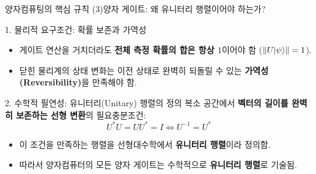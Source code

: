 \documentclass[aspectratio=169, 10pt]{beamer}
\begin{document}
\begin{frame}{양자컴퓨팅의 핵심 규칙 (3)}{양자 게이트: 왜 유니터리 행렬이어야 하는가?} \pause
    \begin{block}{1. 물리적 요구조건: 확률 보존과 가역성}
        \begin{itemize}
            \item 게이트 연산을 거치더라도 \textbf{전체 측정 확률의 합은 항상 $1$}이어야 함 ($\|U|\psi\rangle\| = 1$).
            \item 닫힌 물리계의 상태 변화는 이전 상태로 완벽히 되돌릴 수 있는 \textbf{가역성(Reversibility)}을 만족해야 함.
        \end{itemize}
    \end{block}
    \vspace{0.08cm} \pause
    \begin{exampleblock}{2. 수학적 필연성: 유니터리(Unitary) 행렬의 정의}
        복소 공간에서 \textbf{벡터의 길이를 완벽히 보존하는 선형 변환}의 필요충분조건:
        $$U^* U = U U^* = I \iff U^{-1} = U^*$$
        \begin{itemize}
            \item 이 조건을 만족하는 행렬을 선형대수학에서 \textbf{유니터리 행렬}이라 정의함.
            \item 따라서 양자컴퓨터의 모든 양자 게이트는 수학적으로 \textbf{유니터리 행렬}로 기술됨.
        \end{itemize}
    \end{exampleblock}
\end{frame}
\end{document}

